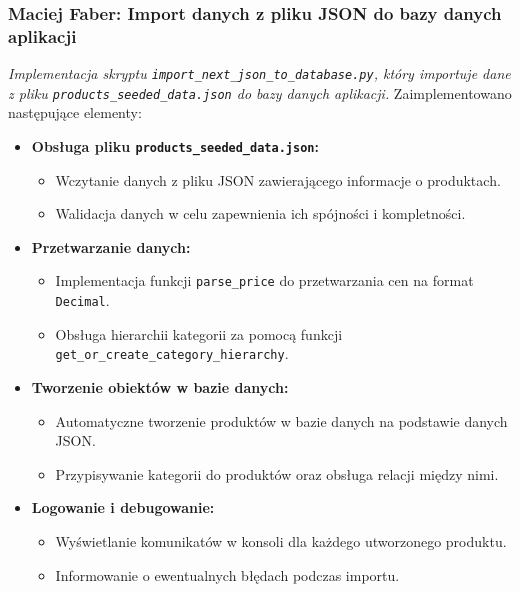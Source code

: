 \documentclass[12pt,a4paper,oneside]{article}
\theoremstyle{definition}
\numberwithin{equation}{section}
\begin{document}
\subsubsection{Maciej Faber: Import danych z pliku JSON do bazy danych aplikacji}
\label{section:1.3.42}
\textit{
Implementacja skryptu \texttt{import\_next\_json\_to\_database.py}, który importuje dane z pliku \texttt{products\_seeded\_data.json} do bazy danych aplikacji.
}
Zaimplementowano następujące elementy:
\begin{itemize}
    \item \textbf{Obsługa pliku \texttt{products\_seeded\_data.json}:}
    \begin{itemize}
        \item Wczytanie danych z pliku JSON zawierającego informacje o produktach.
        \item Walidacja danych w celu zapewnienia ich spójności i kompletności.
    \end{itemize}
    \item \textbf{Przetwarzanie danych:}
    \begin{itemize}
        \item Implementacja funkcji \texttt{parse\_price} do przetwarzania cen na format \texttt{Decimal}.
        \item Obsługa hierarchii kategorii za pomocą funkcji \texttt{get\_or\_create\_category\_hierarchy}.
    \end{itemize}
    \item \textbf{Tworzenie obiektów w bazie danych:}
    \begin{itemize}
        \item Automatyczne tworzenie produktów w bazie danych na podstawie danych JSON.
        \item Przypisywanie kategorii do produktów oraz obsługa relacji między nimi.
    \end{itemize}
    \item \textbf{Logowanie i debugowanie:}
    \begin{itemize}
        \item Wyświetlanie komunikatów w konsoli dla każdego utworzonego produktu.
        \item Informowanie o ewentualnych błędach podczas importu.
    \end{itemize}
\end{itemize}
\end{document}
